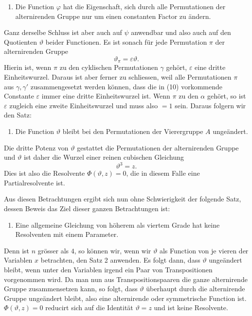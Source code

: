 \documentclass[11pt]{article}
\begin{document}
\begin{enumerate}[label=\arabic*.]
\item Die Function \(\varphi\) hat die Eigenschaft, sich durch alle Permutationen der alternirenden Gruppe nur um einen constanten Factor zu ändern.
\end{enumerate}

Ganz derselbe Schluss ist aber auch auf \(\psi\) anwendbar und also auch auf den Quotienten \(\vartheta\) beider Functionen. Es ist sonach für jede Permutation \(\pi\) der alternirenden Gruppe
\begin{equation}
\vartheta_\pi=\varepsilon\vartheta.
\tag{10}
\end{equation}
Hierin ist, wenn \(\pi\) zu den cyklischen Permutationen \(\gamma\) gehört, \(\varepsilon\) eine dritte Einheitswurzel. Daraus ist aber ferner zu schliessen, weil alle Permutationen \(\pi\) aus \(\gamma,\gamma'\) zusammengesetzt werden können, dass die in (10) vorkommende Constante \(\varepsilon\) immer eine dritte Einheitswurzel ist. Wenn \(\pi\) zu den \(\alpha\) gehört, so ist \(\varepsilon\) zugleich eine zweite Einheitswurzel und muss also \(=1\) sein. Daraus folgern wir den Satz:

\begin{enumerate}[label=\arabic*.,start=2]
\item Die Function \(\vartheta\) bleibt bei den Permutationen der Vierergruppe \(A\) ungeändert.
\end{enumerate}

Die dritte Potenz von \(\vartheta\) gestattet die Permutationen der alternirenden Gruppe und \(\vartheta\) ist daher die Wurzel einer reinen cubischen Gleichung
\[
\vartheta^3=z.
\]
Dies ist also die Resolvente \(\Phi(\vartheta,z)=0\), die in diesem Falle eine Partialresolvente ist.

Aus diesen Betrachtungen ergibt sich nun ohne Schwierigkeit der folgende Satz, dessen Beweis das Ziel dieser ganzen Betrachtungen ist:

\begin{enumerate}[label=\arabic*.,start=3]
\item Eine allgemeine Gleichung von höherem als viertem Grade hat keine Resolventen mit einem Parameter.
\end{enumerate}

Denn ist \(n\) grösser als \(4\), so können wir, wenn wir \(\vartheta\) als Function von je vieren der Variablen \(x\) betrachten, den Satz 2 anwenden. Es folgt dann, dass \(\vartheta\) ungeändert bleibt, wenn unter den Variablen irgend ein Paar von Transpositionen vorgenommen wird. Da man nun aus Transpositionspaaren die ganze alternirende Gruppe zusammensetzen kann, so folgt, dass \(\vartheta\) überhaupt durch die alternirende Gruppe ungeändert bleibt, also eine alternirende oder symmetrische Function ist. \(\Phi(\vartheta,z)=0\) reducirt sich auf die Identität \(\vartheta=z\) und ist keine Resolvente.
\end{document}
